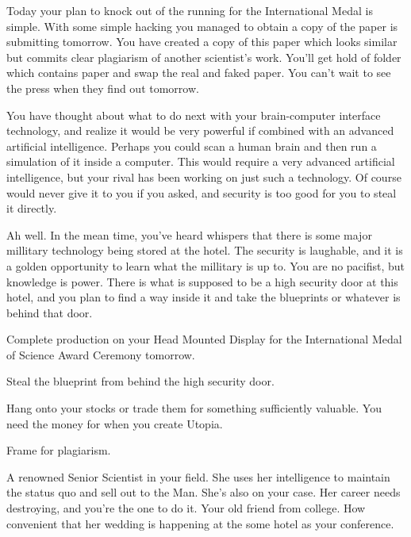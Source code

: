 \documentclass[char]{guildcamp1}
\begin{document}
Today your plan to knock \cScientist{} out of the running for the International Medal is simple.  With some simple hacking you managed to obtain a copy of the paper \cScientist{\they} is submitting tomorrow.  You have created a copy of this paper which looks similar but commits clear plagiarism of another scientist's work.  You'll get hold of \cScientist{\their} folder which contains \cScientist{\their} paper and swap the real and faked paper.  You can't wait to see the press when they find out tomorrow.

You have thought about what to do next with your brain-computer interface technology, and realize it would be very powerful if combined with an advanced artificial intelligence.  Perhaps you could scan a human brain and then run a simulation of it inside a computer.  This would require a very advanced artificial intelligence, but your rival \cScientist{} has been working on just such a technology.  Of course \cScientist{\they} would never give it to you if you asked, and \cScientist{\their} security is too good for you to steal it directly.  

Ah well. In the mean time, you've heard whispers that there is some major millitary technology being stored at the hotel. The security is laughable, and it is a golden opportunity to learn what the millitary is up to. You are no pacifist, but knowledge is power. There is what is supposed to be a high security door at this hotel, and you plan to find a way inside it and take the blueprints or whatever is behind that door.


\begin{itemz}[Goals]
\item Complete production on your Head Mounted Display for the International Medal of Science Award Ceremony tomorrow.
\item Steal the blueprint from behind the high security door.
\item Hang onto your stocks or trade them for something sufficiently valuable. You need the money for when you create Utopia.
\item Frame \cScientist{} for plagiarism.
\end{itemz}




\begin{contacts}
  \contact{\cScientist{}} A renowned Senior Scientist in your field. She uses her intelligence to maintain the status quo and sell out to the Man. She's also on your case. Her career needs destroying, and you're the one to do it.
  \contact{\cBride{}} Your old friend from college. How convenient that her wedding is happening at the some hotel as your conference.
\end{contacts}
\end{document}
